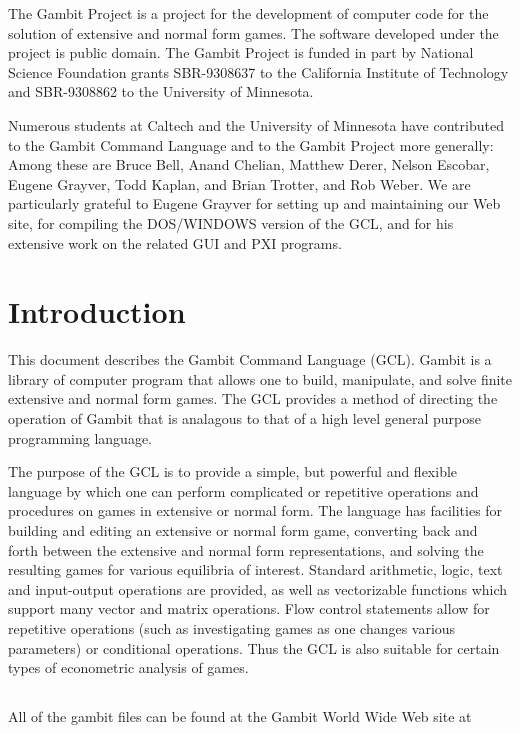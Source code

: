 The Gambit Project is a project for the development of computer code
for the solution of extensive and normal form games.  The software
developed under the project is public domain.  The Gambit Project is
funded in part by National Science Foundation grants SBR-9308637 to
the California Institute of Technology and SBR-9308862 to the
University of Minnesota.

Numerous students at Caltech and the University of Minnesota have
contributed to the Gambit Command Language and to the Gambit Project
more generally: Among these are Bruce Bell, Anand Chelian, Matthew
Derer, Nelson Escobar, Eugene Grayver, Todd Kaplan, and Brian Trotter,
and Rob Weber. We are particularly grateful to Eugene Grayver for
setting up and maintaining our Web site, for compiling the DOS/WINDOWS
version of the GCL, and for his extensive work on the related GUI and
PXI programs.

\chapter{Introduction}
\pagestyle{headings}

This document describes the Gambit Command Language (GCL).  Gambit is
a library of computer program that allows one to build, manipulate,
and solve finite extensive and normal form games. The GCL provides a
method of directing the operation of Gambit that is analagous to that
of a high level general purpose programming language.

The purpose of the GCL is to provide a simple, but powerful and
flexible language by which one can perform complicated or repetitive
operations and procedures on games in extensive or normal form.  The
language has facilities for building and editing an extensive or
normal form game, converting back and forth between the extensive and
normal form representations, and solving the resulting games for
various equilibria of interest.  Standard arithmetic, logic, text and
input-output operations are provided, as well as vectorizable
functions which support many vector and matrix operations.  Flow
control statements allow for repetitive operations (such as
investigating games as one changes various parameters) or conditional
operations.  Thus the GCL is also suitable for certain types of
econometric analysis of games.


\section{}
All of the gambit files can be found at the Gambit World Wide Web site
at


